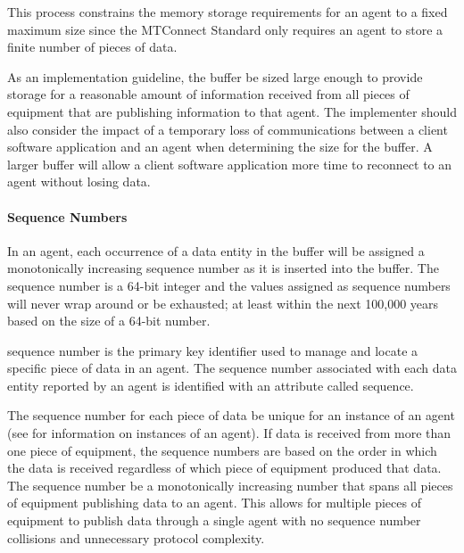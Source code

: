 \documentclass{mtconnect}	%
\begin{document}
\FloatBarrier

This process constrains the memory storage requirements for an \gls{agent} to a fixed maximum size since the MTConnect Standard only requires an \gls{agent} to store a finite number of pieces of data.

As an implementation guideline, the \gls{buffer} \SHOULD be sized large enough to provide storage for a reasonable amount of information received from all pieces of equipment that are publishing information to that \gls{agent}.  The implementer should also consider the impact of a temporary loss of communications between a client software application and an \gls{agent} when determining the size for the \gls{buffer}.  A larger \gls{buffer} will allow a client software application more time to reconnect to an \gls{agent} without losing data.

\paragraph{Sequence Numbers}\mbox{}

In an \gls{agent}, each occurrence of a \gls{data entity} in the \gls{buffer} will be assigned a monotonically increasing \gls{sequence number} as it is inserted into the \gls{buffer}.  The \gls{sequence number} is a 64-bit integer and the values assigned as \glspl{sequence number} will never wrap around or be exhausted; at least within the next 100,000 years based on the size of a 64-bit number.

\gls{sequence number} is the primary key identifier used to manage and locate a specific piece of data in an \gls{agent}.  The \gls{sequence number} associated with each \gls{data entity} reported by an \gls{agent} is identified with an attribute called \gls{sequence}.

The \gls{sequence number} for each piece of data \MUST be unique for an instance of an \gls{agent} (see  for information on \glspl{instance} of an \gls{agent}).  If data is received from more than one piece of equipment, the \glspl{sequence number} are based on the order in which the data is received regardless of which piece of equipment produced that data.  The \gls{sequence number} \MUST be a monotonically increasing number that spans all pieces of equipment publishing data to an \gls{agent}.  This allows for multiple pieces of equipment to publish data through a single \gls{agent} with no \gls{sequence number} collisions and unnecessary protocol complexity.
\end{document}

